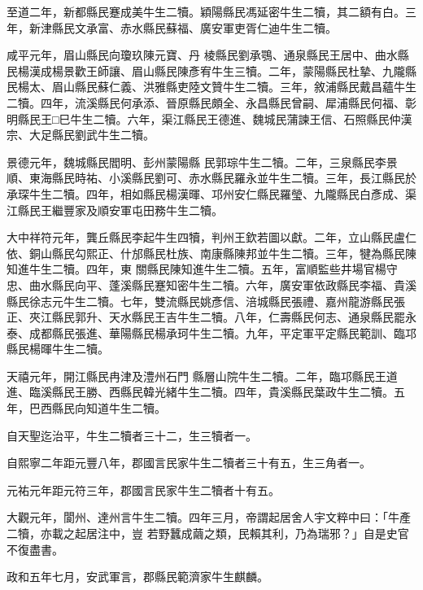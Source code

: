 \begin{pinyinscope}
 至道二年，新都縣民蹇成美牛生二犢。穎陽縣民馮延密牛生二犢，其二額有白。三年，新津縣民文承富、赤水縣民蘇福、廣安軍吏胥仁迪牛生二犢。



 咸平元年，眉山縣民向瓊玖陳元寶、丹
 棱縣民劉承鶚、通泉縣民王居中、曲水縣民楊漢成楊景歡王師讓、眉山縣民陳彥宥牛生三犢。二年，蒙陽縣民杜摯、九隴縣民楊太、眉山縣民蘇仁義、洪雅縣吏陸文贊牛生二犢。三年，敘浦縣民戴昌蘊牛生二犢。四年，流溪縣民何承添、晉原縣民頗全、永昌縣民曾嗣、犀浦縣民何福、彰明縣民王□巳牛生二犢。六年，渠江縣民王德進、魏城民蒲諫王信、石照縣民仲漢宗、大足縣民劉武牛生二犢。



 景德元年，魏城縣民閻明、彭州蒙陽縣
 民郭琮牛生二犢。二年，三泉縣民李景順、東海縣民時祐、小溪縣民劉可、赤水縣民羅永並牛生二犢。三年，長江縣民於承琛牛生二犢。四年，相如縣民楊漢暉、邛州安仁縣民羅瑩、九隴縣民白彥成、渠江縣民王繼豐家及順安軍屯田務牛生二犢。



 大中祥符元年，龔丘縣民李起牛生四犢，判州王欽若圖以獻。二年，立山縣民盧仁依、銅山縣民勾熙正、什邡縣民杜族、南康縣陳邦並牛生二犢。三年，犍為縣民陳知進牛生二犢。四年，東
 關縣民陳知進牛生二犢。五年，富順監些井場官楊守忠、曲水縣民向平、蓬溪縣民蹇知密牛生二犢。六年，廣安軍依政縣民李福、貴溪縣民徐志元牛生二犢。七年，雙流縣民姚彥信、涪城縣民張禮、嘉州龍游縣民張正、夾江縣民郭升、天水縣民王吉牛生二犢。八年，仁壽縣民何志、通泉縣民罷永泰、成都縣民張進、華陽縣民楊承珂牛生二犢。九年，平定軍平定縣民範訓、臨邛縣民楊暉牛生二犢。



 天禧元年，開江縣民冉津及澧州石門
 縣層山院牛生二犢。二年，臨邛縣民王道進、臨溪縣民王勝、西縣民韓光緒牛生二犢。四年，貴溪縣民葉政牛生二犢。五年，巴西縣民向知道牛生二犢。



 自天聖迄治平，牛生二犢者三十二，生三犢者一。



 自熙寧二年距元豐八年，郡國言民家牛生二犢者三十有五，生三角者一。



 元祐元年距元符三年，郡國言民家牛生二犢者十有五。



 大觀元年，閬州、達州言牛生二犢。四年三月，帝謂起居舍人宇文粹中曰：「牛產二犢，亦載之起居注中，豈
 若野蠶成繭之類，民賴其利，乃為瑞邪？」自是史官不復盡書。



 政和五年七月，安武軍言，郡縣民範濟家牛生麒麟。




\end{pinyinscope}
